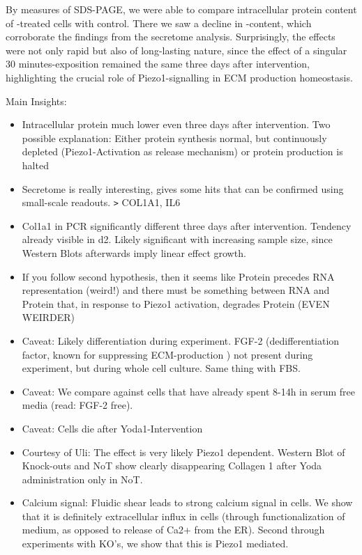 By measures of SDS-PAGE, we were able to compare intracellular protein content of \Yoda-treated cells with control. There we saw a  decline in \colone-content, which corroborate the findings from the secretome analysis. Surprisingly, the effects were not only rapid but also of long-lasting nature, since the effect of a singular 30 minutes\Yoda-exposition remained the same three days after intervention, highlighting the crucial role of Piezo1-signalling in ECM production homeostasis.


Main Insights:
\begin{itemize}
    \item Intracellular protein much lower even three days after intervention. Two possible explanation: Either protein synthesis normal, but continuously depleted (Piezo1-Activation as release mechanism)  or protein production is halted
    
    \item Secretome is really interesting, gives some hits that can be confirmed using small-scale readouts. \texttt{>} COL1A1, IL6
    
    \item Col1a1 in PCR significantly different three days after intervention. Tendency already visible in d2. Likely significant with increasing sample size, since Western Blots afterwards imply linear effect growth.
    
    \item If you follow second hypothesis, then it seems like Protein precedes RNA representation (weird!) and there must be something between RNA and Protein that, in response to Piezo1 activation, degrades Protein (EVEN WEIRDER)
    
     \item  Caveat: Likely differentiation during experiment. FGF-2 (dedifferentiation factor, known for suppressing ECM-production ) not present during experiment, but during whole cell culture. Same thing with FBS. 
     
    \item Caveat: We compare against cells that have already spent 8-14h in serum free media (read: FGF-2 free).    
    
    \item Caveat: Cells die after Yoda1-Intervention
    
    \item Courtesy of Uli: The effect is very likely Piezo1 dependent. Western Blot of Knock-outs and NoT show clearly disappearing Collagen 1 after Yoda administration only in NoT. 
    
    \item Calcium signal: Fluidic shear leads to strong calcium signal in cells. We show that it is definitely extracellular influx in cells (through functionalization of medium, as opposed to release of Ca2+ from the ER). Second through experiments with KO's, we show that this is Piezo1 mediated. 
\end{itemize}



